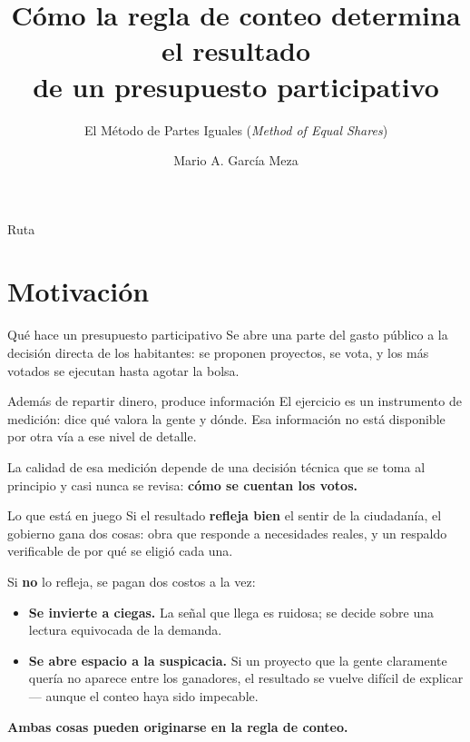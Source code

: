 \documentclass[11pt, aspectratio=169]{beamer}
\title{Cómo la regla de conteo determina el resultado\\ de un presupuesto participativo}
\subtitle{El Método de Partes Iguales \textnormal{(\emph{Method of Equal Shares})}}
\author{Mario A. García Meza}
\institute{Facultad de Economía, Contaduría y Administración\\ Universidad Juárez del Estado de Durango}
\date{}   %
\begin{document}
\maketitle

\begin{frame}{Ruta}
  \tableofcontents
\end{frame}

\section{Motivación}

\begin{frame}{Qué hace un presupuesto participativo}
  Se abre una parte del gasto público a la decisión directa de los habitantes:
  se proponen proyectos, se vota, y los más votados se ejecutan hasta agotar la
  bolsa.

  \begin{block}{Además de repartir dinero, produce información}
    El ejercicio es un \alert{instrumento de medición}: dice qué valora la gente
    y dónde. Esa información no está disponible por otra vía a ese nivel de
    detalle.
  \end{block}

  La calidad de esa medición depende de una decisión técnica que se toma al
  principio y casi nunca se revisa: \textbf{cómo se cuentan los votos.}
\end{frame}

\begin{frame}{Lo que está en juego}
  Si el resultado \textbf{refleja bien} el sentir de la ciudadanía, el gobierno
  gana dos cosas: obra que responde a necesidades reales, y un respaldo
  verificable de por qué se eligió cada una.

  \vspace{0.4em}
  Si \textbf{no} lo refleja, se pagan dos costos a la vez:

  \begin{itemize}
    \item[\textcolor{warndark}{$\rightarrow$}]
      \textbf{Se invierte a ciegas.} La señal que llega es ruidosa; se decide
      sobre una lectura equivocada de la demanda.
    \item[\textcolor{warndark}{$\rightarrow$}]
      \textbf{Se abre espacio a la suspicacia.} Si un proyecto que la gente
      claramente quería no aparece entre los ganadores, el resultado se vuelve
      difícil de explicar --- aunque el conteo haya sido impecable.
  \end{itemize}

  \vspace{0.5em}
  \centering\alert{\textbf{Ambas cosas pueden originarse en la regla de conteo.}}
\end{frame}
\end{document}

